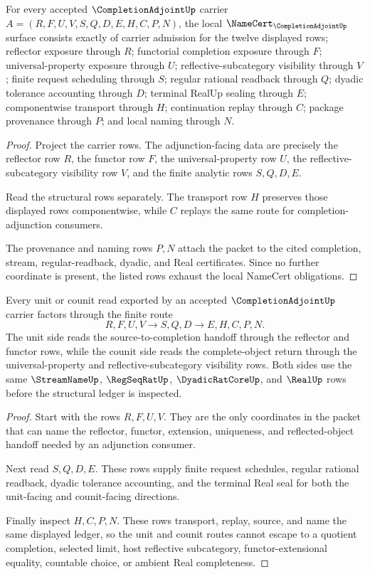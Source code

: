 \begin{theorem}
\label{thm:completion-adjoint-namecert-obligations}
For every accepted $\CompletionAdjointUp$ carrier $A=(R,F,U,V,S,Q,D,E,H,C,P,N)$, the local $\NameCert_{\CompletionAdjointUp}$ surface consists exactly of carrier admission for the twelve displayed rows; reflector exposure through $R$; functorial completion exposure through $F$; universal-property exposure through $U$; reflective-subcategory visibility through $V$; finite request scheduling through $S$; regular rational readback through $Q$; dyadic tolerance accounting through $D$; terminal RealUp sealing through $E$; componentwise transport through $H$; continuation replay through $C$; package provenance through $P$; and local naming through $N$.
\end{theorem}
\begin{proof}
Project the carrier rows. The adjunction-facing data are precisely the reflector row $R$, the functor row $F$, the universal-property row $U$, the reflective-subcategory visibility row $V$, and the finite analytic rows $S,Q,D,E$.

Read the structural rows separately. The transport row $H$ preserves those displayed rows componentwise, while $C$ replays the same route for completion-adjunction consumers.

The provenance and naming rows $P,N$ attach the packet to the cited completion, stream, regular-readback, dyadic, and Real certificates. Since no further coordinate is present, the listed rows exhaust the local NameCert obligations.
\end{proof}

\begin{theorem}
\label{thm:completion-adjoint-unit-counit-ledger}
Every unit or counit read exported by an accepted $\CompletionAdjointUp$ carrier factors through the finite route
$$
R,F,U,V \longrightarrow S,Q,D \longrightarrow E,H,C,P,N .
$$
The unit side reads the source-to-completion handoff through the reflector and functor rows, while the counit side reads the complete-object return through the universal-property and reflective-subcategory visibility rows. Both sides use the same $\StreamNameUp$, $\RegSeqRatUp$, $\DyadicRatCoreUp$, and $\RealUp$ rows before the structural ledger is inspected.
\end{theorem}
\begin{proof}
Start with the rows $R,F,U,V$. They are the only coordinates in the packet that can name the reflector, functor, extension, uniqueness, and reflected-object handoff needed by an adjunction consumer.

Next read $S,Q,D,E$. These rows supply finite request schedules, regular rational readback, dyadic tolerance accounting, and the terminal Real seal for both the unit-facing and counit-facing directions.

Finally inspect $H,C,P,N$. These rows transport, replay, source, and name the same displayed ledger, so the unit and counit routes cannot escape to a quotient completion, selected limit, host reflective subcategory, functor-extensional equality, countable choice, or ambient Real completeness.
\end{proof}

